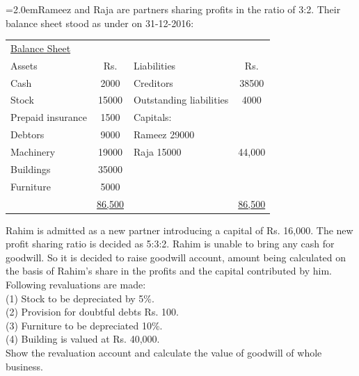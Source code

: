 \documentclass[11pt,a4paper]{article}
\newcommand{\lqn}[2]{\Needspace{6\baselineskip}\par\medskip\noindent\hangindent=2.0em\hangafter=1\makebox[2.0em][l]{\textbf{#1.}}#2\par}
\begin{document}
\lqn{89}{Rameez and Raja are partners sharing profits in the ratio of 3:2. Their balance sheet stood as under on 31-12-2016:\par
\par\smallskip\noindent\hspace*{1.2em}\begin{tabular}{|lclc|}
\hline
\underline{Balance Sheet} &  &  &  \\
Assets & Rs. & Liabilities & Rs. \\
Cash & 2000 & Creditors & 38500 \\
Stock & 15000 & Outstanding liabilities & 4000 \\
Prepaid insurance & 1500 & Capitals: &  \\
Debtors & 9000 & Rameez    29000 &  \\
Machinery & 19000 & Raja          15000 & 44,000 \\
Buildings & 35000 &  &  \\
Furniture & 5000 &  &  \\
 & \underline{86,500} &  & \underline{86,500} \\
\hline
\end{tabular}\par\smallskip
Rahim is admitted as a new partner introducing a capital of Rs. 16,000. The new profit sharing ratio is decided as 5:3:2. Rahim is unable to bring any cash for goodwill. So it is decided to raise goodwill account, amount being calculated on the basis of Rahim’s share in the profits and the capital contributed by him. Following revaluations are made:\\
(1) Stock to be depreciated by 5\%.\\
(2) Provision for doubtful debts Rs. 100.\\
(3) Furniture to be depreciated 10\%.\\
(4) Building is valued at Rs. 40,000.\\
Show the revaluation account and calculate the value of goodwill of whole business.\par
}
\end{document}
